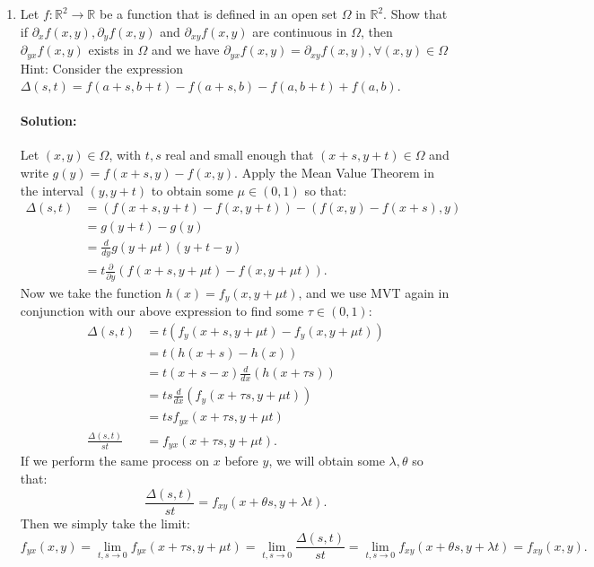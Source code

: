 \documentclass{article}
\begin{document}
\begin{enumerate}
\newpage
\item Let $f : \mathbb{R}^2 \to \mathbb{R}$ be a function that is defined in an open set $\Omega$ in $\mathbb{R}^2$.  Show that if $\partial_x f(x,y), \partial_y f(x,y)$ and $\partial_{xy} f(x,y)$ are continuous in $\Omega$, then $\partial_{yx} f(x,y)$ exists in $\Omega$ and we have  $\partial_{yx} f(x,y) = \partial_{xy} f(x,y), \forall (x,y) \in \Omega$  Hint: Consider the expression $\Delta(s,t) = f(a+s,b+t) - f(a+s,b) - f(a,b+t) + f(a,b)$.  
    \paragraph{Solution: } Let $(x,y)\in \Omega$, with $t,s$ real and small enough that $(x+s,y+t)\in \Omega$ and write $g(y)=f(x+s,y)-f(x,y).$ Apply the Mean Value Theorem in the interval $(y,y+t)$ to obtain some $\mu\in (0,1)$ so that:
    \begin{align*}
        \Delta(s,t)&= \left( f(x+s,y+t)-f(x,y+t) \right) -(f(x,y)-f(x+s),y) \\
        &=  g(y+t)-g(y)\\
        &= \frac{d}{dy}g(y+\mu t)(y+t-y) \\
        &= t\frac{\partial }{\partial y} \left( f(x+s,y+\mu t)- f(x,y+\mu t)\right) 
    .\end{align*}
    Now we take the function $h(x)=f_y(x,y+\mu t)$, and we use MVT again in conjunction with our above expression to find some $\tau\in (0,1)$:
    \begin{align*}
        \Delta(s,t) &= t(f_y(x+s,y+\mu t)- f_y(x,y+\mu t))\\
                    &=t(h(x+s)-h(x))\\
                    &= t (x+s-x) \frac{d}{dx}\left( h(x+\tau s) \right)  \\
                    &= t s\frac{d}{dx}\left( f_y(x+\tau s,y+\mu t) \right)  \\
                    &= tsf_{yx}(x+\tau s,y+\mu t) \\
        \frac{\Delta(s,t)}{st}&= f_{yx}(x+\tau s,y+\mu t) 
    .\end{align*}
    If we perform the same process on $x$ before $y$, we will obtain some $\lambda,\theta$ so that:
    \[ \frac{\Delta(s,t)}{st}= f_{xy}(x+\theta s,y+\lambda t) .\] 
    Then we simply take the limit:
    \[
    f_{yx}(x,y)=\lim_{t,s \to 0} f_{yx}(x+\tau s,y+\mu t)=\lim_{t,s \to 0} \frac{\Delta(s,t)}{st}=\lim_{t,s \to 0} f_{xy}(x+\theta s,y+\lambda t)=f_{xy}(x,y)
    .\] 


\end{enumerate}
\end{document}
